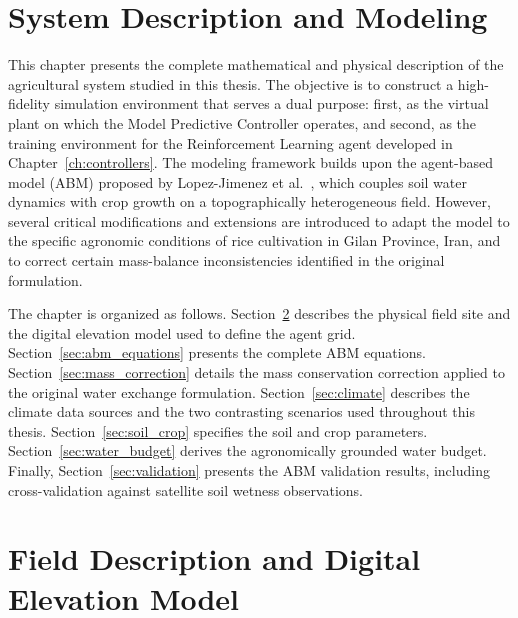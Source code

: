
\section{System Description and Modeling}
\label{ch:system}

This chapter presents the complete mathematical and physical description of the agricultural system studied in this thesis. The objective is to construct a high-fidelity simulation environment that serves a dual purpose: first, as the virtual plant on which the Model Predictive Controller operates, and second, as the training environment for the Reinforcement Learning agent developed in Chapter~\ref{ch:controllers}. The modeling framework builds upon the agent-based model (ABM) proposed by Lopez-Jimenez et al.~\cite{Lopezjimenez2024}, which couples soil water dynamics with crop growth on a topographically heterogeneous field. However, several critical modifications and extensions are introduced to adapt the model to the specific agronomic conditions of rice cultivation in Gilan Province, Iran, and to correct certain mass-balance inconsistencies identified in the original formulation.

The chapter is organized as follows. Section~\ref{sec:field} describes the physical field site and the digital elevation model used to define the agent grid. Section~\ref{sec:abm_equations} presents the complete ABM equations. Section~\ref{sec:mass_correction} details the mass conservation correction applied to the original water exchange formulation. Section~\ref{sec:climate} describes the climate data sources and the two contrasting scenarios used throughout this thesis. Section~\ref{sec:soil_crop} specifies the soil and crop parameters. Section~\ref{sec:water_budget} derives the agronomically grounded water budget. Finally, Section~\ref{sec:validation} presents the ABM validation results, including cross-validation against satellite soil wetness observations.


\section{Field Description and Digital Elevation Model}
\label{sec:field}

